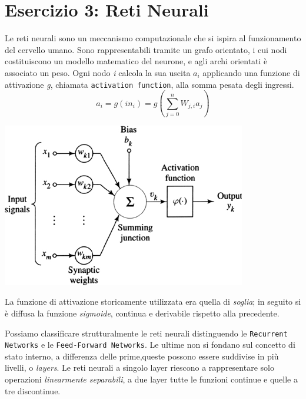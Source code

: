 		\section{Esercizio 3: Reti Neurali}
			\label{sec: es3}
			Le reti neurali sono un meccanismo computazionale che si ispira al funzionamento del cervello umano. Sono rappresentabili tramite un grafo orientato, i cui nodi costituiscono un modello matematico del neurone, e agli archi orientati è associato un peso. Ogni nodo \textit{i} calcola la sua uscita $a_{i}$ applicando una funzione di attivazione \textit{g}, chiamata \texttt{activation function}, alla somma pesata degli ingressi.%
			\begin{equation}
			a_{i} = g(in_{i}) =g( \sum_{j=0}^n W_{j,i} a_{j})
			\end{equation}
			\medskip
			\begin{center}
				\includegraphics[width=0.8\textwidth, height=0.3\textheight]{neurone.jpg}
			\end{center}
			La funzione di attivazione storicamente utilizzata era quella di \emph{soglia}; in seguito si è diffusa la funzione \emph{sigmoide}, continua e derivabile rispetto alla precedente.\par
			Possiamo classificare strutturalmente le reti neurali distinguendo le \texttt{Recurrent Networks} e le \texttt{Feed-Forward Networks}. Le ultime non si fondano sul concetto di stato interno, a differenza delle prime,queste possono essere suddivise in più livelli, o \emph{layers}. Le reti neurali a singolo layer riescono a rappresentare solo operazioni \emph{linearmente separabili}, a due layer tutte le funzioni continue e quelle a tre discontinue.
